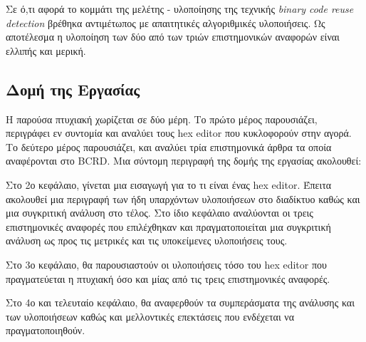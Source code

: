 Σε ό,τι αφορά το κομμάτι της μελέτης - υλοποίησης της τεχνικής \emph{binary code reuse detection} βρέθηκα αντιμέτωπος με απαιτητικές αλγοριθμικές υλοποιήσεις. Ως αποτέλεσμα η υλοποίηση των δύο από των τριών επιστημονικών αναφορών είναι ελλιπής και μερική.

\subsection{Δομή της Εργασίας}
Η παρούσα πτυχιακή χωρίζεται σε δύο μέρη.
Το πρώτο μέρος παρουσιάζει, περιγράφει εν συντομία και αναλύει τους hex editor που κυκλοφορούν στην αγορά.
Το δεύτερο μέρος παρουσιάζει, και αναλύει τρία επιστημονικά άρθρα τα οποία αναφέρονται στο BCRD.
Μια σύντομη περιγραφή της δομής της εργασίας ακολουθεί:

Στο 2ο κεφάλαιο, γίνεται μια εισαγωγή για το τι είναι ένας hex editor.
Έπειτα ακολουθεί μια περιγραφή των ήδη υπαρχόντων υλοποιήσεων στο διαδίκτυο καθώς και μια συγκριτική ανάλυση στο τέλος.
Στο ίδιο κεφάλαιο αναλύονται οι τρεις επιστημονικές αναφορές που επιλέχθηκαν και πραγματοποιείται μια συγκριτική ανάλυση ως προς τις μετρικές και τις υποκείμενες υλοποιήσεις τους.

Στο 3ο κεφάλαιο, θα παρουσιαστούν οι υλοποιήσεις τόσο του hex editor που πραγματεύεται η πτυχιακή όσο και μίας από τις τρεις επιστημονικές αναφορές.

Στο 4ο και τελευταίο κεφάλαιο, θα αναφερθούν τα συμπεράσματα της ανάλυσης και των υλοποιήσεων καθώς και μελλοντικές επεκτάσεις που ενδέχεται να πραγματοποιηθούν.
